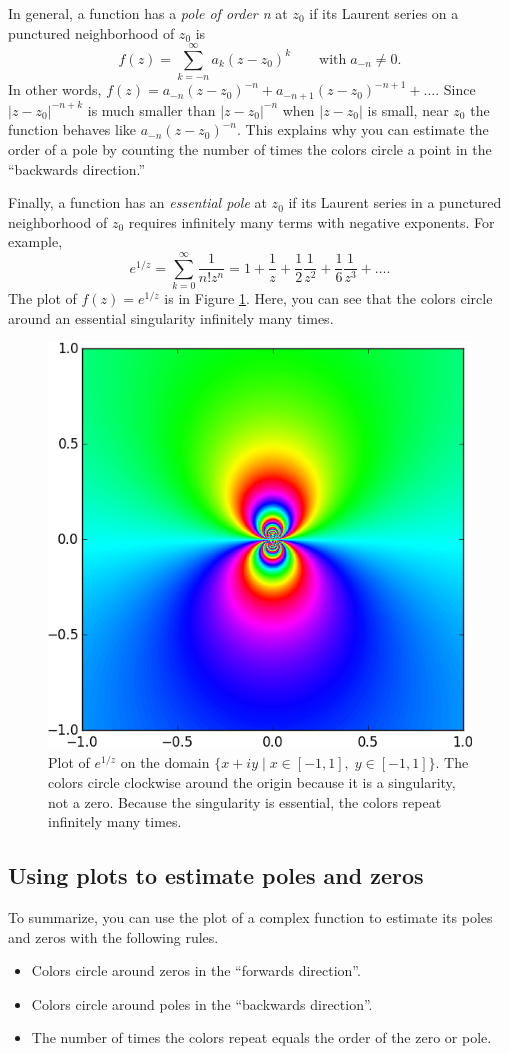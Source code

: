 In general, a function has a \emph{pole of order n} at $z_0$ if its Laurent series on a punctured neighborhood of $z_0$ is
\[
f(z) = \sum_{k=-n}^\infty a_k(z-z_0)^k  \qquad \text{with} \; a_{-n} \neq 0.
\]
In other words, $f(z) = a_{-n}(z-z_0)^{-n}+a_{-n+1}(z-z_0)^{-n+1} + \ldots$.
Since $|z-z_0|^{-n+k}$ is much smaller than $|z-z_0|^{-n}$ when $|z-z_0|$ is small, near $z_0$ the function behaves like $a_{-n}(z-z_0)^{-n}$.
This explains why you can estimate the order of a pole by counting the number of times the colors circle a point in the ``backwards direction.''

Finally, a function has an \emph{essential pole} at $z_0$ if its Laurent series in a punctured neighborhood of $z_0$ requires infinitely many terms with negative exponents.
For example, 
\[
e^{1/z} = \sum_{k=0}^{\infty}\frac{1}{n! z^n} = 1+\frac{1}{z}+\frac{1}{2}\frac{1}{z^2}+\frac{1}{6}\frac{1}{z^3}+\ldots.
\]
The plot of $f(z) = e^{1/z}$ is in Figure \ref{fig:essential_singularity}. 
Here, you can see that the colors circle around an essential singularity infinitely many times.

\begin{figure}
\includegraphics[width=.7\textwidth]{essential_pole.png}
\caption{Plot of $e^{1/z}$ on the domain $\{x+iy \mid x \in [-1,1] , \; y \in [-1,1]\}$.
The colors circle clockwise around the origin because it is a singularity, not a zero.
Because the singularity is essential, the colors repeat infinitely many times.}
\label{fig:essential_singularity}
\end{figure}

\subsection*{Using plots to estimate poles and zeros}
To summarize, you can use the plot of a complex function to estimate its poles and zeros with the following rules.
\begin{itemize}
\item Colors circle around zeros in the ``forwards direction''.
\item Colors circle around poles in the ``backwards direction''.
\item The number of times the colors repeat equals the order of the zero or pole.
\end{itemize}

